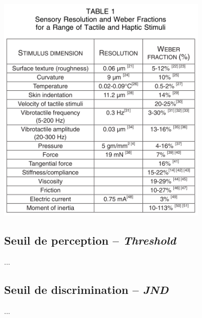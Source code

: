 \includegraphics[width=10cm]{Photos/tab_seuil.png}

\subsection{Seuil de perception -- \textit{Threshold}}
...

\subsection{Seuil de discrimination -- \textit{JND}}
...

